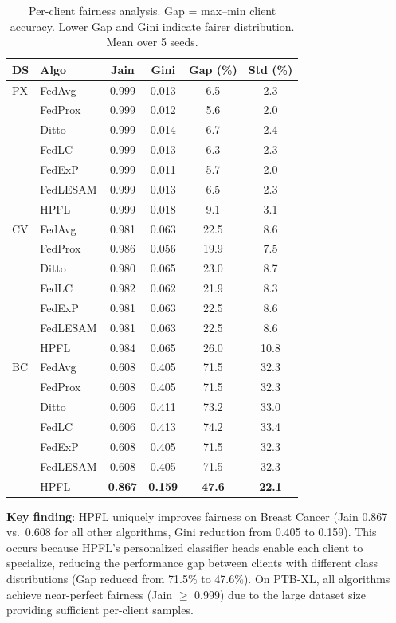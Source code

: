\documentclass[conference]{IEEEtran}
\begin{document}
\begin{table}[t]
\centering
\caption{Per-client fairness analysis. Gap = max--min client accuracy. Lower Gap and Gini indicate fairer distribution. Mean over 5 seeds.}
\label{tab:fairness_detail}
\footnotesize
\begin{tabular}{ll cccc}
\toprule
\textbf{DS} & \textbf{Algo} & \textbf{Jain} & \textbf{Gini} & \textbf{Gap (\%)} & \textbf{Std (\%)} \\
\midrule
PX & FedAvg & 0.999 & 0.013 & 6.5 & 2.3 \\
 & FedProx & 0.999 & 0.012 & 5.6 & 2.0 \\
 & Ditto & 0.999 & 0.014 & 6.7 & 2.4 \\
 & FedLC & 0.999 & 0.013 & 6.3 & 2.3 \\
 & FedExP & 0.999 & 0.011 & 5.7 & 2.0 \\
 & FedLESAM & 0.999 & 0.013 & 6.5 & 2.3 \\
 & HPFL & 0.999 & 0.018 & 9.1 & 3.1 \\
\midrule
CV & FedAvg & 0.981 & 0.063 & 22.5 & 8.6 \\
 & FedProx & 0.986 & 0.056 & 19.9 & 7.5 \\
 & Ditto & 0.980 & 0.065 & 23.0 & 8.7 \\
 & FedLC & 0.982 & 0.062 & 21.9 & 8.3 \\
 & FedExP & 0.981 & 0.063 & 22.5 & 8.6 \\
 & FedLESAM & 0.981 & 0.063 & 22.5 & 8.6 \\
 & HPFL & 0.984 & 0.065 & 26.0 & 10.8 \\
\midrule
BC & FedAvg & 0.608 & 0.405 & 71.5 & 32.3 \\
 & FedProx & 0.608 & 0.405 & 71.5 & 32.3 \\
 & Ditto & 0.606 & 0.411 & 73.2 & 33.0 \\
 & FedLC & 0.606 & 0.413 & 74.2 & 33.4 \\
 & FedExP & 0.608 & 0.405 & 71.5 & 32.3 \\
 & FedLESAM & 0.608 & 0.405 & 71.5 & 32.3 \\
 & HPFL & \textbf{0.867} & \textbf{0.159} & \textbf{47.6} & \textbf{22.1} \\
\bottomrule
\end{tabular}
\end{table}

\textbf{Key finding}: HPFL uniquely improves fairness on Breast Cancer (Jain 0.867 vs.\ 0.608 for all other algorithms, Gini reduction from 0.405 to 0.159). This occurs because HPFL's personalized classifier heads enable each client to specialize, reducing the performance gap between clients with different class distributions (Gap reduced from 71.5\% to 47.6\%). On PTB-XL, all algorithms achieve near-perfect fairness (Jain $\geq$ 0.999) due to the large dataset size providing sufficient per-client samples.
\end{document}
